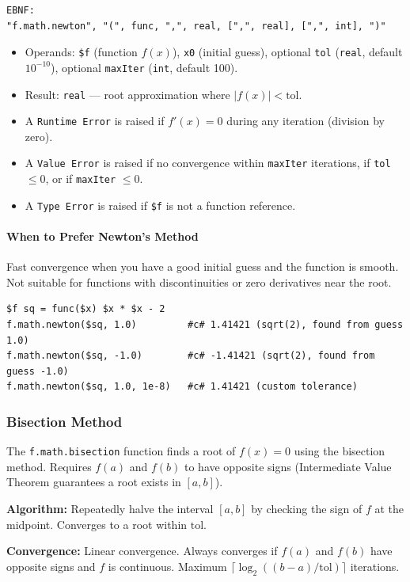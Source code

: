 \begin{verbatim}
EBNF:
"f.math.newton", "(", func, ",", real, [",", real], [",", int], ")"
\end{verbatim}
\begin{itemize}
\item Operands: \texttt{\$f} (function $f(x)$), \texttt{x0} (initial guess), optional \texttt{tol} (\texttt{real}, default $10^{-10}$), optional \texttt{maxIter} (\texttt{int}, default 100).
\item Result: \texttt{real} --- root approximation where $|f(x)| < \text{tol}$.
\item A \texttt{Runtime Error} is raised if $f'(x) = 0$ during any iteration (division by zero).
\item A \texttt{Value Error} is raised if no convergence within \texttt{maxIter} iterations, if \texttt{tol} $\leq 0$, or if \texttt{maxIter} $\leq 0$.
\item A \texttt{Type Error} is raised if \texttt{\$f} is not a function reference.
\end{itemize}

\paragraph{When to Prefer Newton's Method}
Fast convergence when you have a good initial guess and the function is smooth. Not suitable for functions with discontinuities or zero derivatives near the root.

\begin{verbatim}
$f sq = func($x) $x * $x - 2
f.math.newton($sq, 1.0)         #c# 1.41421 (sqrt(2), found from guess 1.0)
f.math.newton($sq, -1.0)        #c# -1.41421 (sqrt(2), found from guess -1.0)
f.math.newton($sq, 1.0, 1e-8)   #c# 1.41421 (custom tolerance)
\end{verbatim}

\subsubsection{Bisection Method}
The \texttt{f.math.bisection} function finds a root of $f(x) = 0$ using the bisection method. Requires $f(a)$ and $f(b)$ to have opposite signs (Intermediate Value Theorem guarantees a root exists in $[a, b]$).

\textbf{Algorithm:} Repeatedly halve the interval $[a, b]$ by checking the sign of $f$ at the midpoint. Converges to a root within $\text{tol}$.

\textbf{Convergence:} Linear convergence. Always converges if $f(a)$ and $f(b)$ have opposite signs and $f$ is continuous. Maximum $\lceil \log_2((b-a)/\text{tol}) \rceil$ iterations.

